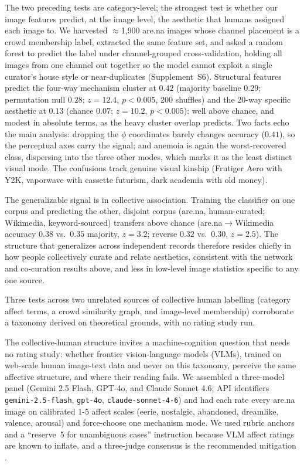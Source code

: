\documentclass[11pt]{article}
\begin{document}
The two preceding tests are category-level; the strongest
test is whether our image features predict, at the image level, the aesthetic that humans assigned each
image to. We harvested $\approx$1{,}900 are.na images whose channel placement is a crowd
membership label, extracted the same feature set, and asked a random forest to predict the label
under channel-grouped cross-validation, holding all images from one channel out together so
the model cannot exploit a single curator's house style or near-duplicates (Supplement~S6).
Structural features predict the four-way mechanism cluster at $0.42$ (majority baseline $0.29$;
permutation null $0.28$; $z=12.4$, $p<0.005$, 200 shuffles) and the 20-way specific aesthetic at
$0.13$ (chance $0.07$; $z=10.2$, $p<0.005$): well above chance, and modest in absolute terms, as
the heavy cluster overlap predicts. Two facts echo the main analysis: dropping the $\phi$
coordinates barely changes accuracy ($0.41$), so the perceptual axes carry the signal; and
anemoia is again the worst-recovered class, dispersing into the three other modes, which
marks it as the least distinct visual mode. The confusions track genuine visual kinship
(Frutiger Aero with Y2K, vaporwave with cassette futurism, dark academia with old money).

The generalizable signal is in collective association. Training the classifier on one
corpus and predicting the other, disjoint corpus (are.na, human-curated; Wikimedia,
keyword-sourced) transfers above chance (are.na$\to$Wikimedia accuracy $0.38$ vs.\ $0.35$ majority,
$z=3.2$; reverse $0.32$ vs.\ $0.30$, $z=2.5$). The structure that generalizes across independent
records therefore resides chiefly in how people collectively curate and relate aesthetics,
consistent with the network and co-curation results above, and less in low-level image statistics
specific to any one source.

Three tests across two unrelated sources of collective human labelling (category affect terms, a
crowd similarity graph, and image-level membership) corroborate a taxonomy derived on theoretical
grounds, with no rating study run.


The collective-human structure invites a machine-cognition question that needs no rating study:
whether frontier vision-language models (VLMs), trained on web-scale human image-text data and
never on this taxonomy, perceive the same affective structure, and where their reading fails. We
assembled a three-model panel (Gemini 2.5 Flash, GPT-4o, and Claude Sonnet 4.6; API identifiers
\texttt{gemini-2.5-flash}, \texttt{gpt-4o}, \texttt{claude-sonnet-4-6}) and had each rate
every are.na image on calibrated 1-5 affect scales (eerie, nostalgic, abandoned, dreamlike,
valence, arousal) and force-choose one mechanism mode. We used rubric anchors and a ``reserve~5
for unambiguous cases'' instruction because VLM affect ratings are known to inflate, and a
three-judge consensus is the recommended mitigation \citep{aicabench2026}.
\end{document}

